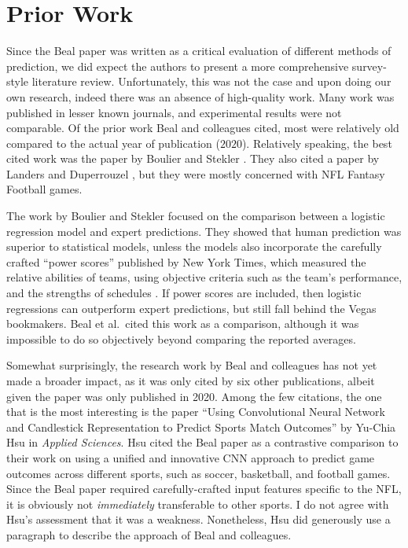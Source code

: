 \documentclass[10pt]{article}
\begin{document}
\section{Prior Work}

Since the Beal paper was written as a critical evaluation of
different methods of prediction, we did expect the authors to present a more
comprehensive survey-style literature review. Unfortunately, this was not the case and
upon doing our own research, indeed there was an absence of high-quality work. Many
work was published in lesser known journals, and experimental results were not comparable.
Of the prior work Beal and colleagues cited, most were relatively old compared to the actual
year of publication ($2020$). Relatively speaking, the best cited work was
the paper by Boulier and Stekler \cite{Boulier2003}. They also cited a paper by
Landers and Duperrouzel \cite{Landers2018}, but they were mostly concerned with
NFL Fantasy Football games.

The work by Boulier and Stekler \cite{Boulier2003} focused on the comparison between
a logistic regression model and expert predictions. They showed that human prediction
was superior to statistical models, unless the models also incorporate the
carefully crafted ``power scores'' published by New York Times, which measured
the relative abilities of teams, using
objective criteria such as the team’s performance, and
the strengths of schedules \cite{Boulier2003}. If power
scores are included,
then logistic regressions can outperform expert predictions, but still
fall behind the Vegas bookmakers. Beal et al.~cited this work as a comparison, although
it was impossible to do so objectively beyond comparing the reported averages.

Somewhat surprisingly, the research work by Beal and colleagues
has not yet made a broader impact, as it was only cited by
six other publications, albeit given the paper was only published in 2020. Among the few
citations, the one that is the most interesting is 
the paper ``Using Convolutional Neural Network and Candlestick Representation to
Predict Sports Match Outcomes'' by Yu-Chia Hsu \cite{Hsu2021} in 
\textit{Applied Sciences}. Hsu cited the Beal paper as a contrastive comparison to their work
on using a unified and innovative CNN approach to predict game outcomes across different
sports, such as soccer, basketball, and football games. Since the Beal paper required
carefully-crafted
input features specific to the NFL, it is obviously not \textit{immediately} transferable
to other sports. I do not agree with Hsu's assessment that it was a weakness. Nonetheless,
Hsu did generously use a paragraph to describe the approach of Beal and colleagues.
\end{document}
